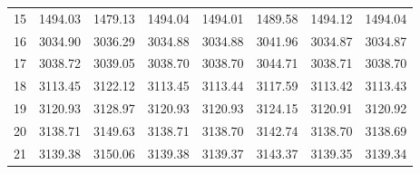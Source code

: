 \documentclass[10pt,oneside]{article}
\begin{document}
\begin{table}[h!]
\begin{tabular}{cccccccc}
15 &   1494.03 & 1479.13 & 1494.04 &    1494.01 &      1489.58 & 1494.12 &   1494.04 \\
16 &   3034.90 & 3036.29 & 3034.88 &    3034.88 &      3041.96 & 3034.87 &   3034.87 \\
17 &   3038.72 & 3039.05 & 3038.70 &    3038.70 &      3044.71 & 3038.71 &   3038.70 \\
18 &   3113.45 & 3122.12 & 3113.45 &    3113.44 &      3117.59 & 3113.42 &   3113.43 \\
19 &   3120.93 & 3128.97 & 3120.93 &    3120.93 &      3124.15 & 3120.91 &   3120.92 \\
20 &   3138.71 & 3149.63 & 3138.71 &    3138.70 &      3142.74 & 3138.70 &   3138.69 \\
21 &   3139.38 & 3150.06 & 3139.38 &    3139.37 &      3143.37 & 3139.35 &   3139.34 \\
\bottomrule
\end{tabular}
\end{table}
\end{document}
